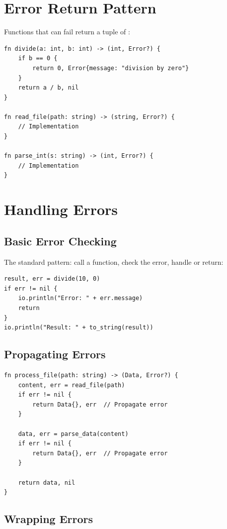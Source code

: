 \section{Error Return Pattern}

Functions that can fail return a tuple of :

\begin{lstlisting}
fn divide(a: int, b: int) -> (int, Error?) {
    if b == 0 {
        return 0, Error{message: "division by zero"}
    }
    return a / b, nil
}

fn read_file(path: string) -> (string, Error?) {
    // Implementation
}

fn parse_int(s: string) -> (int, Error?) {
    // Implementation
}
\end{lstlisting}

\section{Handling Errors}

\subsection{Basic Error Checking}

The standard pattern: call a function, check the error, handle or return:

\begin{lstlisting}
result, err = divide(10, 0)
if err != nil {
    io.println("Error: " + err.message)
    return
}
io.println("Result: " + to_string(result))
\end{lstlisting}

\subsection{Propagating Errors}

\begin{lstlisting}
fn process_file(path: string) -> (Data, Error?) {
    content, err = read_file(path)
    if err != nil {
        return Data{}, err  // Propagate error
    }

    data, err = parse_data(content)
    if err != nil {
        return Data{}, err  // Propagate error
    }

    return data, nil
}
\end{lstlisting}

\subsection{Wrapping Errors}

